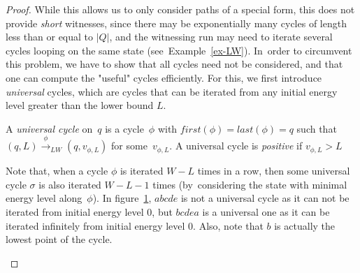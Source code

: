 \begin{proof}
While this allows us to only consider paths of a special form, this
does not provide \emph{short} witnesses, since there may be
exponentially many cycles of length less than or equal to $|Q|$,
and the witnessing run may need to iterate several cycles looping on
the same state (see~Example~\ref{ex-LW}).
In~order to circumvent this problem, we have to show that all cycles need not be considered, and that one 
can compute the "useful" cycles efficiently. 
For this, we first
introduce \emph{universal} cycles, which are cycles
that can be iterated from any initial energy level greater than the lower bound $L$.

\vskip 0.7cm
\begin{definition}
A \emph{universal cycle} on~$q$ is a cycle~$\phi$ with
$first(\phi)=last(\phi)=q$ such that $(q,L)\xrightarrow{\phi}_{LW}(q,v_{\phi,L})$ for some~$v_{\phi,L}$. A universal cycle is \emph{positive} if $v_{\phi,L}>L$
\end{definition}

\vskip 0.4cm
Note that, when a cycle $\phi$ is iterated $W-L$ times in a row, then some universal cycle $\sigma$ is also iterated $W-L-1$ times (by~considering the state with minimal energy level along~$\phi$). 
In figure~\ref{unicycle}, $abcde$ is not a universal cycle as it can not be iterated from initial energy level 0, but $bcdea$ is a universal one as it can be iterated infinitely from initial energy level 0. Also, note that $b$ is actually the lowest point of the cycle.

\begin{figure}[htb]
    \centering
  
  \label{unicycle}
\end{figure}
    
    


\end{proof}
